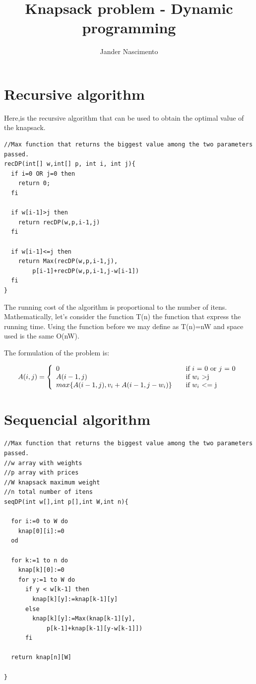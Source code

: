 \documentclass{article}
\begin{document}
\title{Knapsack problem - Dynamic programming}

\author{Jander Nascimento}

\maketitle

\tableofcontents

\section{Recursive algorithm}

Here,is the recursive algorithm\cite{algojava} that can be used to obtain the optimal value of the knapsack.

\begin{lstlisting}
//Max function that returns the biggest value among the two parameters passed.
recDP(int[] w,int[] p, int i, int j){
  if i=0 OR j=0 then 
    return 0;
  fi

  if w[i-1]>j then
    return recDP(w,p,i-1,j)
  fi

  if w[i-1]<=j then
    return Max(recDP(w,p,i-1,j),
 		p[i-1]+recDP(w,p,i-1,j-w[i-1])
  fi
}
\end{lstlisting}

The running cost of the algorithm is proportional to the number of itens. Mathematically, let's consider
the function T(n) the function that express the running time. Using the function before we may define as 
T(n)=nW and space used is the same O(nW).

The formulation of the problem is:

\[
  A(i,j) = \left\{ 
  \begin{array}{l l}
    0 & \quad \textnormal{if $i$ = 0 or $j$ = 0}\\
    A(i-1,j) & \quad \textnormal{if $w_i$ \textgreater j}\\
    max\{A(i-1,j),v_i+A(i-1,j-w_i)\} & \quad \textnormal{if $w_i$ \textless= j}\\
  \end{array} \right.
\]



\section{Sequencial algorithm}          

\begin{lstlisting}
//Max function that returns the biggest value among the two parameters passed.
//w array with weights
//p array with prices
//W knapsack maximum weight
//n total number of itens
seqDP(int w[],int p[],int W,int n){

  for i:=0 to W do
    knap[0][i]:=0
  od

  for k:=1 to n do
    knap[k][0]:=0
    for y:=1 to W do
      if y < w[k-1] then
        knap[k][y]:=knap[k-1][y]
      else
        knap[k][y]:=Max(knap[k-1][y],
			p[k-1]+knap[k-1][y-w[k-1]])
      fi

  return knap[n][W]

}
\end{lstlisting}
\end{document}
